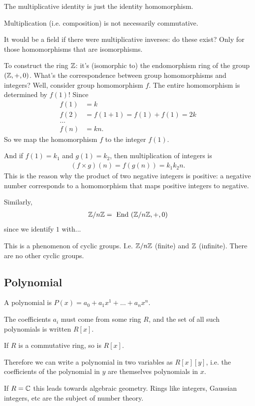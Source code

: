 The multiplicative identity is just the identity homomorphism.

Multiplication (i.e. composition) is not necessarily commutative.

It would be a field if there were multiplicative inverses: do these exist? Only
for those homomorphisms that are isomorphisms.

To construct the ring $\mathbb{Z}$: it's (isomorphic to) the endomorphism ring of the
group $(\mathbb{Z}, +, 0)$. What's the correspondence between group homomorphisms and
integers? Well, consider group homomorphism $f$. The entire homomorphism is
determined by $f(1)$! Since
\begin{align*}
  f(1) &= k\\
  f(2) &= f(1 + 1) = f(1) + f(1) = 2k\\
       \ldots\\
  f(n) &= kn.
\end{align*}
So we map the homomorphism $f$ to the integer $f(1)$.

And if $f(1) = k_1$ and $g(1) = k_2$, then multiplication of integers is
\begin{align*}
  (f \times g)(n) = f(g(n)) = k_1k_2n.
\end{align*}
This is the reason why the product of two negative integers is positive: a
negative number corresponds to a homomorphism that maps positive integers to
negative.

Similarly,
\begin{align*}
  \mathbb{Z}/n\mathbb{Z} = ~\text{End}~(\mathbb{Z}/n\mathbb{Z}, +, 0)
\end{align*}
since we identify $1$ with...

This is a phenomenon of cyclic groups. I.e. $\mathbb{Z}/n\mathbb{Z}$ (finite) and $\mathbb{Z}$
(infinite). There are no other cyclic groups.

\subsection{Polynomial}

A polynomial is $P(x) = a_0 + a_1x^1 + \ldots + a_nx^n$.

The coefficients $a_i$ must come from some ring $R$, and the set of all such
polynomials is written $R[x]$.

If $R$ is a commutative ring, so is $R[x]$.

Therefore we can write a polynomial in two variables as $R[x][y]$, i.e. the
coefficients of the polynomial in $y$ are themselves polynomials in $x$.

If $R = \mathbb{C}$ this leads towards algebraic geometry. Rings like integers,
Gaussian integers, etc are the subject of number theory.

